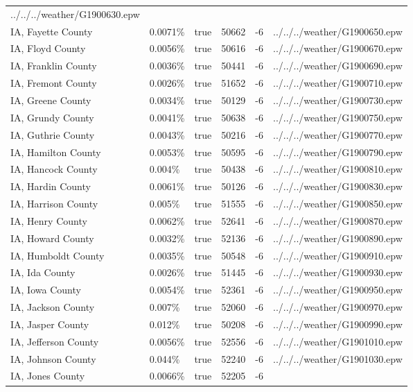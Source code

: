 \begin{longtable}[]{@{}llllll@{}}
../../../weather/G1900630.epw \\
IA, Fayette County & 0.0071\% & true & 50662 & -6 &
../../../weather/G1900650.epw \\
IA, Floyd County & 0.0056\% & true & 50616 & -6 &
../../../weather/G1900670.epw \\
IA, Franklin County & 0.0036\% & true & 50441 & -6 &
../../../weather/G1900690.epw \\
IA, Fremont County & 0.0026\% & true & 51652 & -6 &
../../../weather/G1900710.epw \\
IA, Greene County & 0.0034\% & true & 50129 & -6 &
../../../weather/G1900730.epw \\
IA, Grundy County & 0.0041\% & true & 50638 & -6 &
../../../weather/G1900750.epw \\
IA, Guthrie County & 0.0043\% & true & 50216 & -6 &
../../../weather/G1900770.epw \\
IA, Hamilton County & 0.0053\% & true & 50595 & -6 &
../../../weather/G1900790.epw \\
IA, Hancock County & 0.004\% & true & 50438 & -6 &
../../../weather/G1900810.epw \\
IA, Hardin County & 0.0061\% & true & 50126 & -6 &
../../../weather/G1900830.epw \\
IA, Harrison County & 0.005\% & true & 51555 & -6 &
../../../weather/G1900850.epw \\
IA, Henry County & 0.0062\% & true & 52641 & -6 &
../../../weather/G1900870.epw \\
IA, Howard County & 0.0032\% & true & 52136 & -6 &
../../../weather/G1900890.epw \\
IA, Humboldt County & 0.0035\% & true & 50548 & -6 &
../../../weather/G1900910.epw \\
IA, Ida County & 0.0026\% & true & 51445 & -6 &
../../../weather/G1900930.epw \\
IA, Iowa County & 0.0054\% & true & 52361 & -6 &
../../../weather/G1900950.epw \\
IA, Jackson County & 0.007\% & true & 52060 & -6 &
../../../weather/G1900970.epw \\
IA, Jasper County & 0.012\% & true & 50208 & -6 &
../../../weather/G1900990.epw \\
IA, Jefferson County & 0.0056\% & true & 52556 & -6 &
../../../weather/G1901010.epw \\
IA, Johnson County & 0.044\% & true & 52240 & -6 &
../../../weather/G1901030.epw \\
IA, Jones County & 0.0066\% & true & 52205 & -6 &

\end{longtable}
